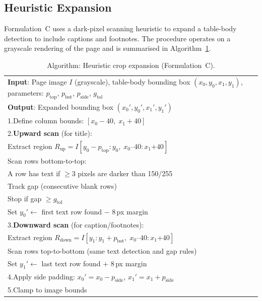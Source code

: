 \documentclass[pdflatex,sn-mathphys-num,iicol]{sn-jnl}
\begin{document}
\begin{appendices}

\section{Heuristic Expansion}\label{app:heuristic}

Formulation~C uses a dark-pixel scanning heuristic to expand a table-body detection
to include captions and footnotes. The procedure operates on a grayscale rendering of
the page and is summarised in Algorithm~\ref{alg:heuristic}.

\begin{table}[ht!]
\caption{Algorithm: Heuristic crop expansion (Formulation~C).}
\label{alg:heuristic}
\small
\begin{tabular}{@{}p{}@{}}
\toprule
\textbf{Input}: Page image $I$ (grayscale), table-body bounding box
$(x_0, y_0, x_1, y_1)$, parameters: $p_{\text{top}}$, $p_{\text{bot}}$,
$p_{\text{side}}$, $g_{\text{tol}}$ \\
\textbf{Output}: Expanded bounding box $(x_0', y_0', x_1', y_1')$ \\
\midrule
1.\enspace Define column bounds: $[x_0 - 40,\; x_1 + 40]$ \\
2.\enspace \textbf{Upward scan} (for title): \\
\quad Extract region $R_{\text{up}} = I[y_0 - p_{\text{top}} : y_0,\; x_0\text{--}40 : x_1\text{+}40]$ \\
\quad Scan rows bottom-to-top: \\
\qquad A row has text if $\geq 3$ pixels are darker than 150/255 \\
\qquad Track gap (consecutive blank rows) \\
\qquad Stop if gap $\geq g_{\text{tol}}$ \\
\quad Set $y_0' \gets$ first text row found $-$ 8\,px margin \\
3.\enspace \textbf{Downward scan} (for caption/footnotes): \\
\quad Extract region $R_{\text{down}} = I[y_1 : y_1 + p_{\text{bot}},\; x_0\text{--}40 : x_1\text{+}40]$ \\
\quad Scan rows top-to-bottom (same text detection and gap rules) \\
\quad Set $y_1' \gets$ last text row found $+$ 8\,px margin \\
4.\enspace Apply side padding: $x_0' = x_0 - p_{\text{side}}$,\; $x_1' = x_1 + p_{\text{side}}$ \\
5.\enspace Clamp to image bounds \\
\bottomrule
\end{tabular}
\end{table}


\end{appendices}
\end{document}
